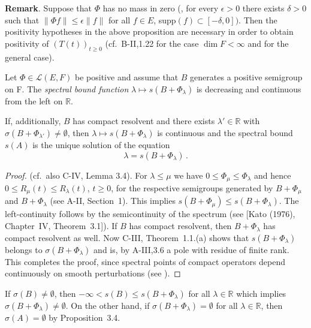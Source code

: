 \noindent
\textbf{Remark}. Suppose that $\Phi$ has no mass in zero (\ie, for every $\epsilon > 0$ there exists $\delta > 0$ such that $\|\Phi f\| \leq \epsilon \|f\|$ for all $f \in E$, supp$(f) \subset [-\delta,0])$. 
Then the positivity hypotheses in the above proposition are necessary in order to obtain positivity of $(T(t))_{t \geq 0}$ (cf.\ B-II,1.22 for the case $\dim F < \infty$ and \citet{kerscher:1986} for the general case).
\begin{proposition}\label{prop:b4-3.6}
	Let $\Phi \in \mathcal{L}(E,F)$ be positive and assume that $B$ generates a positive semigroup on F. 
    The \emph{spectral bound function} $\lambda \mapsto s(B + \Phi_\lambda)$ is decreasing and continuous from the left on $\mathbb{R}$.
	
	If, additionally, $B$ has compact resolvent and there exists $\lambda' \in \mathbb{R}$ with $\sigma(B + \Phi_{\lambda'}) \neq \emptyset$, then $\lambda \mapsto s(B + \Phi_\lambda)$ is continuous and the spectral bound $s(A)$ is the unique solution of the equation
	\begin{equation}\label{eq:b4-3.5}
		\lambda = s(B + \Phi_\lambda)\,.
	\end{equation}
\end{proposition}

\begin{proof} (cf.\ also C-IV, Lemma 3.4). 
For $\lambda \leq \mu$ we have $0 \leq \Phi_\mu \leq \Phi_\lambda$ and hence $0 \leq R_\mu(t) \leq R_\lambda(t)$, $t \geq 0$, for the respective semigroups generated by $B + \Phi_\mu$ and $B + \Phi_\lambda$ (see A-II, Section~1). 
This implies $s(B + \Phi_\mu) \leq s(B + \Phi_\lambda)$. 
The left-continuity follows by the semicontinuity of the spectrum (see 
[Kato (1976), Chapter~IV, Theorem~3.1]).
\citet[Chapter~IV, Theorem~3.1]{kato:1966} 
If $B$ has compact resolvent, then $B + \Phi_\lambda$ has compact resolvent as well. 
Now C-III, Theorem~1.1.(a) shows that $s(B + \Phi_\lambda)$ belongs to $\sigma(B + \Phi_\lambda)$ and is, by A-III,3.6 a pole with residue of finite rank. 
This completes the proof, since spectral points of compact operators depend continuously on smooth perturbations (see \citet[VII,6.Theorem~9]{dunfordschwartz:1958}).
\end{proof}

If $\sigma(B) \neq \emptyset$, then $-\infty < s(B) \leq s(B + \Phi_\lambda)$ for all $\lambda \in \mathbb{R}$ which implies $\sigma(B + \Phi_\lambda) \neq \emptyset$. 
On the other hand, if $\sigma(B + \Phi_\lambda) = \emptyset$ for all $\lambda \in \mathbb{R}$,  then $\sigma(A) = \emptyset$ by Proposition~3.4.

